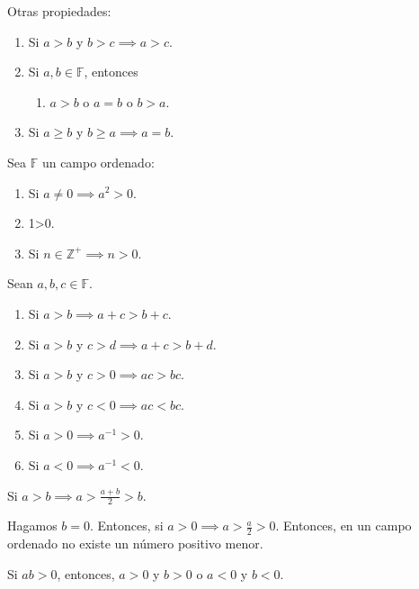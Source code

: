 \begin{prop} Otras propiedades:
	\begin{enumerate}
		\item Si $a>b$ y $b>c\implies a>c$. 
		\item Si $a,b\in \mathbb{F}$, entonces 
		\begin{enumerate}
			\item $a>b$ o $a=b$ o $b>a$. 
		\end{enumerate}
	\item Si $a\geq b$ y $b\geq a\implies a=b$.
	\end{enumerate}
\end{prop}

\begin{prop}
	Sea $\mathbb{F}$ un campo ordenado:
	\begin{enumerate}
	\item Si $a\neq 0\implies a^2>0$. 
	\item 1>0. 
	\item Si $n\in \mathbb{Z}^+\implies n>0$. 	
	\end{enumerate}
\end{prop}

\begin{teorema}
	Sean $a,b,c\in \mathbb{F}$. 
	\begin{enumerate}
		\item Si $a>b\implies a+c>b+c$.
		\item Si $a>b$ y $c>d\implies a+c>b+d$.
		\item Si $a>b$ y $c>0\implies ac>bc$. 
		\item Si $a>b$ y $c<0\implies ac<bc$.
		\item Si $a>0\implies a^{-1}>0$. 
		\item Si $a<0\implies a^{-1}<0$.  
	\end{enumerate}
\end{teorema}

\begin{corolario}
	Si $a>b\implies a>\frac{a+b}{2}>b$. 
	\begin{nota}
		Hagamos $b=0$. Entonces, si $a>0\implies a>\frac{a}{2}>0$. Entonces, en un campo ordenado no existe un número positivo menor. 
	\end{nota}
\end{corolario}

\begin{teorema}
	Si $ab>0$, entonces, $a>0$ y $b>0$ o $a<0$ y $b<0$. 
\end{teorema}


